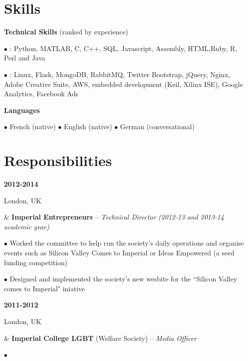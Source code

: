 \documentclass[a4paper,10pt,oneside]{article}
\begin{document}
\section*{Skills}
\begin{flushleft}
	\vspace{-0.8em}
	
	
	\hspace{1em} \textbf{Technical Skills} (ranked by experience)
	
	\hspace{2em} $\bullet$ \underline{}: Python, MATLAB, C, C++, SQL, Javascript, Assembly, HTML,Ruby, R, Perl and Java
	
	\hspace{2em} \parbox{0.95\textwidth}{$\bullet$ \underline{}: Linux, Flask, MongoDB, RabbitMQ, Twitter Bootstrap, jQuery, Nginx, Adobe Creative Suite, AWS, embedded  development (Keil, Xilinx ISE), Google Analytics, Facebook Ads}
	
	\hspace{1em} \textbf{Languages}
	
	\hspace{2em} $\bullet$ French (native) $\bullet$ English (native) $\bullet$ German (conversational)
	
\end{flushleft}


\section*{Responsibilities}

\begin{body}
{\textbf{2012-2014} \par London, UK} & \textbf{Imperial Entrepreneurs} – \textit{Technical Director (2012-13 and 2013-14 academic year)}

$\bullet$ Worked the committee to help run the society’s daily operations and organise events such as Silicon Valley Comes to Imperial or Ideas Empowered (a seed funding competition)

$\bullet$ Designed and implemented the society’s new wesbite for the ``Silicon Valley comes to Imperial" iniative
\\ 
{\textbf{2011-2012} \par London, UK} & \textbf{Imperial College LGBT} (Welfare Society) – \textit{Media Officer}

$\bullet$ 

\end{body}
\end{document}
